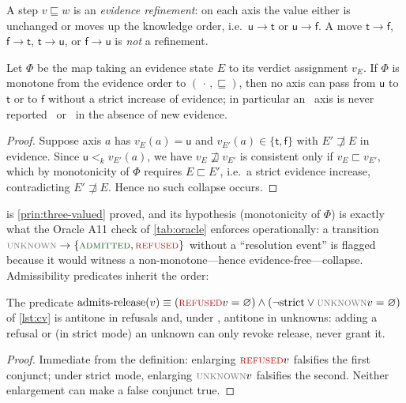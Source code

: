 \begin{definition}
A step $v\sqsubseteq w$ is an \emph{evidence refinement}: on each axis the value
either is unchanged or moves up the knowledge order, i.e.\ $\mathsf u\to\mathsf t$
or $\mathsf u\to\mathsf f$. A move $\mathsf t\to\mathsf f$, $\mathsf f\to\mathsf
t$, $\mathsf t\to\mathsf u$, or $\mathsf f\to\mathsf u$ is \emph{not} a
refinement.
\end{definition}

\begin{theorem}
\label{thm:noncollapse}
Let $\Phi$ be the map taking an evidence state $E$ to its verdict assignment
$v_E$. If $\Phi$ is monotone from the evidence order to $(\,\cdot\,,\sqsubseteq)$,
then no axis can pass from $\mathsf u$ to $\mathsf t$ or to $\mathsf f$ without a
strict increase of evidence; in particular an \unknownstat\ axis is never
reported \admitted\ or \ in the absence of new evidence.
\end{theorem}
\begin{proof}
Suppose axis $a$ has $v_E(a)=\mathsf u$ and $v_{E'}(a)\in\{\mathsf t,\mathsf f\}$
with $E'\not\sqsupset E$ in evidence. Since $\mathsf u<_k v_{E'}(a)$, we have
$v_E\not\sqsupseteq v_{E'}$ is consistent only if $v_E\sqsubset v_{E'}$, which by
monotonicity of $\Phi$ requires $E\sqsubset E'$, i.e.\ a strict evidence increase,
contradicting $E'\not\sqsupset E$. Hence no such collapse occurs.
\end{proof}

 is \cref{prin:three-valued} proved, and its hypothesis
(monotonicity of $\Phi$) is exactly what the Oracle A11 check of
\cref{tab:oracle} enforces operationally: a transition $\unknownstat\to\{\admitted,\refused\}$
without a ``resolution event'' is flagged because it would witness a
non-monotone---hence evidence-free---collapse. Admissibility predicates inherit
the order:

\begin{corollary}
\label{cor:release}
The predicate $\mathrm{admits\text{-}release}(v)\equiv(\refused v=\varnothing)
\wedge(\neg\mathrm{strict}\vee\unknownstat v=\varnothing)$ of \cref{lst:cv} is
antitone in refusals and, under , antitone in unknowns: adding
a refusal or (in strict mode) an unknown can only revoke release, never grant it.
\end{corollary}
\begin{proof}
Immediate from the definition: enlarging $\refused v$ falsifies the first
conjunct; under strict mode, enlarging $\unknownstat v$ falsifies the second.
Neither enlargement can make a false conjunct true.
\end{proof}

